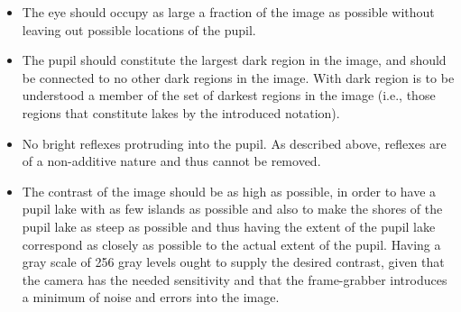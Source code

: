 \begin{itemize}
\item The eye should occupy as large a fraction of the image as
  possible without leaving out possible locations of the pupil.
\item The pupil should constitute the largest dark region in the
  image, and should be connected to no other dark regions in the
  image.  With dark region is to be understood a member of the set of
  darkest regions in the image (i.e., those regions that constitute
  lakes by the introduced notation).
\item No bright reflexes protruding into the pupil.  As described
  above, reflexes are of a non-additive nature and thus cannot be
  removed.
\item The contrast of the image should be as high as possible, in
  order to have a pupil lake with as few islands as possible and also
  to make the shores of the pupil lake as steep as possible and thus
  having the extent of the pupil lake correspond as closely as
  possible to the actual extent of the pupil.  Having a gray scale of
  256 gray levels ought to supply the desired contrast, given that the
  camera has the needed sensitivity and that the frame-grabber
  introduces a minimum of noise and errors into the image.
\end{itemize}
